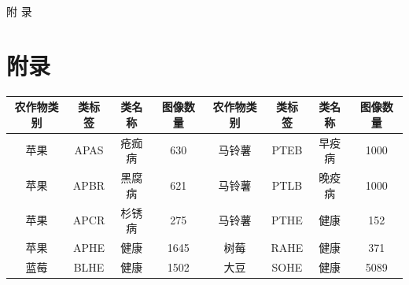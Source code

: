 \documentclass[12pt, a4paper, twoside]{ctexart}
\begin{document}
附  录


\chapter{附录}




\begin{table}[htbp]
\centering
\begin{tabular}{|c|c|c|c|c|c|c|c|}
\hline
农作物类别 & 类标签 & 类名称 & 图像数量 & 农作物类别 & 类标签 & 类名称 & 图像数量 \\
\hline
苹果 & APAS & 疮痂病 & 630 & 马铃薯 & PTEB & 早疫病 & 1000 \\
\hline
苹果 & APBR & 黑腐病 & 621 & 马铃薯 & PTLB & 晚疫病 & 1000 \\
\hline
苹果 & APCR & 杉锈病 & 275 & 马铃薯 & PTHE & 健康 & 152 \\
\hline
苹果 & APHE & 健康 & 1645 & 树莓 & RAHE & 健康 & 371 \\
\hline
蓝莓 & BLHE & 健康 & 1502 & 大豆 & SOHE & 健康 & 5089 \\
\hline
\end{tabular}
\end{table}
\end{document}
